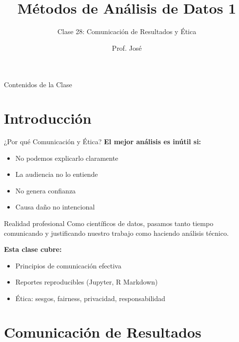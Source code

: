 \documentclass[aspectratio=169]{beamer}
\title[MAD1 - Clase 28]{Métodos de Análisis de Datos 1}
\subtitle{Clase 28: Comunicación de Resultados y Ética}
\author{Prof. José}
\institute{Departamento de Matemática \\ Universidad Nacional del Sur}
\date{}
\begin{document}
\begin{frame}
\titlepage
\end{frame}

\begin{frame}{Contenidos de la Clase}
\tableofcontents
\end{frame}

\section{Introducción}

\begin{frame}{¿Por qué Comunicación y Ética?}
\textbf{El mejor análisis es inútil si:}
\begin{itemize}
\item No podemos explicarlo claramente
\item La audiencia no lo entiende
\item No genera confianza
\item Causa daño no intencional
\end{itemize}

\vspace{0.3cm}

\begin{block}{Realidad profesional}
Como científicos de datos, pasamos tanto tiempo comunicando y justificando nuestro trabajo como haciendo análisis técnico.
\end{block}

\vspace{0.3cm}

\textbf{Esta clase cubre:}
\begin{itemize}
\item Principios de comunicación efectiva
\item Reportes reproducibles (Jupyter, R Markdown)
\item Ética: sesgos, fairness, privacidad, responsabilidad
\end{itemize}
\end{frame}

\section{Comunicación de Resultados}
\end{document}
